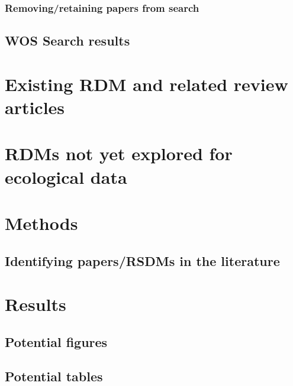 \documentclass[12pt,twoside]{reedthesis}
\begin{document}
\hypertarget{removingretaining-papers-from-search}{%
\subsubsection{Removing/retaining papers from search}\label{removingretaining-papers-from-search}}

\hypertarget{wos-search-results}{%
\subsection{WOS Search results}\label{wos-search-results}}

\hypertarget{existing-rdm-and-related-review-articles}{%
\section{Existing RDM and related review articles}\label{existing-rdm-and-related-review-articles}}

\hypertarget{rdms-not-yet-explored-for-ecological-data}{%
\section{RDMs not yet explored for ecological data}\label{rdms-not-yet-explored-for-ecological-data}}

\hypertarget{methods-1}{%
\section{Methods}\label{methods-1}}

\hypertarget{identifying-papersrsdms-in-the-literature}{%
\subsection{Identifying papers/RSDMs in the literature}\label{identifying-papersrsdms-in-the-literature}}

\hypertarget{results}{%
\section{Results}\label{results}}

\hypertarget{potential-figures}{%
\subsection{Potential figures}\label{potential-figures}}

\hypertarget{potential-tables}{%
\subsection{Potential tables}\label{potential-tables}}
\end{document}

